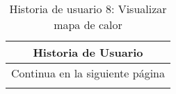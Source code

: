

\begin{longtable}{|p{6.7cm}|p{6.7cm}|}
    \caption{Historia de usuario 8: Visualizar mapa de calor} \label{tab:historia-8}
    \\
    \hline
    \multicolumn{2}{|c|}{\textbf{Historia de Usuario}}                                                                                                                                       \\
    \hline

    \endfirsthead

    \hline
    \endhead

    \hline
    \multicolumn{2}{|c|}{{Continua en la siguiente página}}                                                                                                                                  \\
    \hline
    \endfoot

    \hline
    \endlastfoot


\end{longtable}
